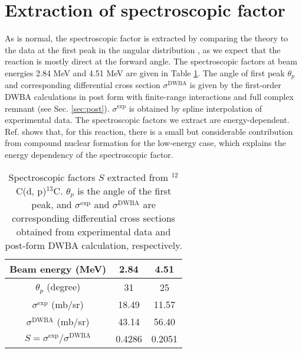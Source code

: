 \section{Extraction of spectroscopic factor}
As is normal, the spectroscopic factor is extracted by comparing the theory to the data at the first peak in the angular distribution
\cite{PhysRevC.69.064313}, as we expect that the reaction is mostly direct at the forward angle. 
The spectroscopic factors at beam energies 2.84 MeV and 4.51 MeV are given in Table \ref{tab:spec}. 
The angle of first peak $\theta_{p}$ and corresponding differential cross section $\sigma^{\mathrm{DWBA}}$ is given by the first-order DWBA calculations in post form with finite-range interactions and full complex remnant (see Sec. \ref{sec:post}). 
$\sigma^{\mathrm{exp}}$ is obtained by spline interpolation of experimental data. 
The spectroscopic factors we extract are energy-dependent. 
Ref. \cite{PhysRev.101.209} shows that, for this reaction, there is a small but considerable contribution from compound nuclear formation for the low-energy case, which explains the energy dependency of the spectroscopic factor. 
\begin{table}[bt]
	\centering
	\caption{Spectroscopic factors $S$ extracted from $^{12}$C(d, p)$^{13}$C. 
	$\theta_p$ is the angle of the first peak, and $\sigma^{\mathrm{exp}}$ and $\sigma^{\mathrm{DWBA}}$ are corresponding differential cross sections obtained from experimental data and post-form DWBA calculation, respectively. }
	\label{tab:spec}
	\begin{tabular}{ccc}
		\hline
		\hline
		Beam energy (MeV)                  & 2.84 & 4.51 \\
		\hline
		$\theta_p$ (degree)                &  31 & 25 \\
		$\sigma^{\mathrm{exp}}$ (mb/sr)    &  18.49 & 11.57 \\
		$\sigma^{\mathrm{DWBA}}$ (mb/sr)   &  43.14 & 56.40 \\
		$S=\sigma^{\mathrm{exp}}/\sigma^{\mathrm{DWBA}}$ & 0.4286  & 0.2051 \\
		\hline
		\hline
	\end{tabular}
\end{table}